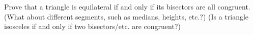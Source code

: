 Prove that a triangle is equilateral if and only if its bisectors are all congruent.\newline
(What about different segments, such as medians, heights, etc.?)\newline
(Is a triangle isosceles if and only if two bisectors/etc. are congruent?)
